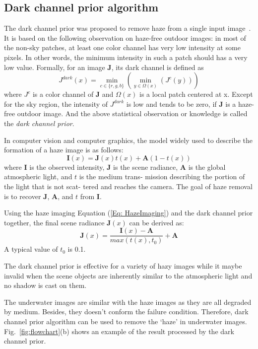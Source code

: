 \documentclass[conference]{IEEEtran}
\begin{document}
\subsection{Dark channel prior algorithm}
The dark channel prior was proposed to remove haze from a single input image~\cite{he2011single}. It is based on the following observation on haze-free outdoor images: in most of the non-sky patches, at least one color channel has very low intensity at some pixels. In other words, the minimum intensity in such a patch should has a very low value. Formally, for an image $\mathbf{J}$, its dark channel is defined as
\begin{equation}
J^{dark}(x) = \min_{c\in \{r,g,b\}}(\min_{y\in \Omega(x)}(J^c(y)))
\end{equation}
where $J^c$ is a color channel of $\mathbf{J}$ and $\Omega(x)$ is a local patch centered at x. Except for the sky region, the intensity of $J^{dark}$ is low and tends to be zero, if \textbf{J} is a haze-free outdoor image. And the above statistical observation or knowledge is called the \textit{dark channel prior}.

In computer vision and computer graphics, the model widely used to describe the formation of a haze image is as follows:
\begin{equation}
\mathbf{I}(x) = \mathbf{J}(x)t(x) + \mathbf{A}(1 - t(x))
\label{Eq: HazeImaging}
\end{equation}
where $\mathbf{I}$ is the observed intensity, $\mathbf{J}$ is the scene radiance, $\mathbf{A}$ is the global atmospheric light, and $t$ is the medium trans- mission describing the portion of the light that is not scat- tered and reaches the camera. The goal of haze removal is to recover $\mathbf{J}$, $\mathbf{A}$, and $t$ from $\mathbf{I}$.

Using the haze imaging Equation (\ref{Eq: HazeImaging}) and the dark channel prior together, the final scene radiance $\mathbf{J}(x)$ can be derived as:
\begin{equation}
\mathbf{J}(x) = \frac{\mathbf{I}(x)-\mathbf{A}}{max(t(x), t_0)} + \mathbf{A}
\end{equation}
A typical value of $t_0$ is 0.1.

The dark channel prior is effective for a variety of hazy images while it maybe invalid when the scene objects are inherently similar to the atmospheric light and no shadow is cast on them.

The underwater images are similar with the haze images as they are all degraded by medium. Besides, they doesn't conform the failure condition. Therefore, dark channel prior algorithm can be used to remove the ‘haze’ in underwater images. Fig.~\ref{fig:flowchart}(b) shows an example of the result processed by the dark channel prior. 
\end{document}
